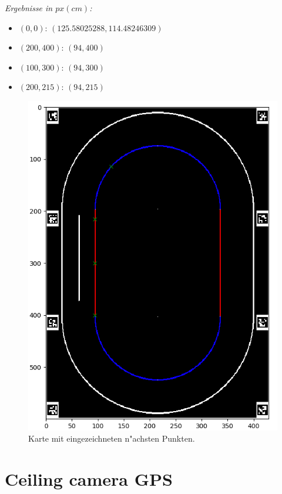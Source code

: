 \documentclass[10pt,oneside,a4paper]{article}
\begin{document}
    \emph{Ergebnisse in \( px(cm) \):}
    \begin{itemize}
      \item{\((0,0)\)}: \( (125.58025288, 114.48246309) \)
      \item{\((200,400)\)}: \( (94, 400) \)
      \item{\((100,300)\)}: \( (94, 300) \)
      \item{\((200,215)\)}: \( (94, 215) \)
    \end{itemize}
    \begin{figure}[h]
      \centering
      \includegraphics[scale=0.5]{pictures/closest_point_graph.png}
      \caption{Karte mit eingezeichneten n"achsten Punkten.}
    \end{figure}

  \section{Ceiling camera GPS}
\end{document}

